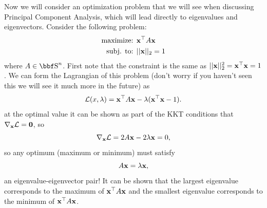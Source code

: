 \documentclass{article}
\begin{document}
Now we will consider an optimization problem that we will see when
discussing Principal Component Analysis, which will lead directly
to eigenvalues and eigenvectors. Consider the following problem:
\begin{align*}
    \text{maximize: } & {\bf x}^\top A{\bf x}\\
    \text{subj. to: } & ||{\bf x}||_2 = 1\\
\end{align*}
where $A\in\SS^n$.
First note that the constraint is the same as $||{\bf x}||_2^2 = {\bf x}^\top{\bf x} = 1$.
We can form the Lagrangian of this problem (don't worry if you haven't seen this we
will see it much more in the future) as
\[
    \mathcal{L}(x,\lambda) = {\bf x}^\top A{\bf x} - \lambda ({\bf x}^\top{\bf x} - 1).
\]
at the optimal value it can be shown as part of the KKT conditions that
$\nabla_{\bf x} \mathcal{L} = {\bf 0}$, so
\[
    \nabla_{\bf x} \mathcal{L} = 2A{\bf x} - 2\lambda{\bf x} = 0,
\]
so any optimum (maximum or minimum) must satisfy
\[
    A{\bf x} = \lambda{\bf x},
\]
an eigenvalue-eigenvector pair! It can be shown that the largest eigenvalue
corresponds to the maximum of ${\bf x}^\top A{\bf x}$ and the smallest eigenvalue corresponds
to the minimum of ${\bf x}^\top A{\bf x}$.
\end{document}
